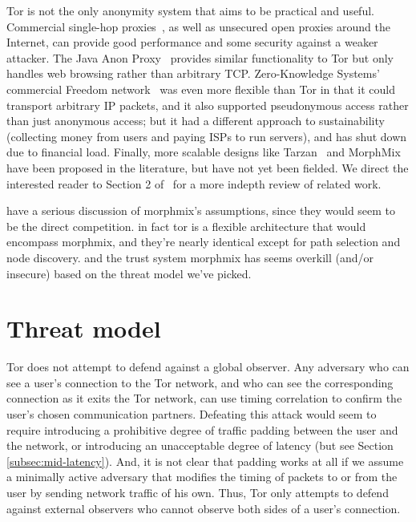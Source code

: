 \documentclass{llncs}
\begin{document}

Tor is not the only anonymity system that aims to be practical and useful.
Commercial single-hop proxies~\cite{anonymizer}, as well as unsecured
open proxies around the Internet, can provide good
performance and some security against a weaker attacker. The Java
Anon Proxy~\cite{web-mix} provides similar functionality to Tor but only
handles web browsing rather than arbitrary TCP\@.
Zero-Knowledge Systems' commercial Freedom
network~\cite{freedom21-security} was even more flexible than Tor in
that it could transport arbitrary IP packets, and it also supported
pseudonymous access rather than just anonymous access; but it had
a different approach to sustainability (collecting money from users
and paying ISPs to run servers), and has shut down due to financial
load.  Finally, more scalable designs like Tarzan~\cite{tarzan:ccs02} and
MorphMix~\cite{morphmix:fc04} have been proposed in the literature, but
have not yet been fielded. We direct the interested reader to Section
2 of~\cite{tor-design} for a more indepth review of related work.


have a serious discussion of morphmix's assumptions, since they would
seem to be the direct competition. in fact tor is a flexible architecture
that would encompass morphmix, and they're nearly identical except for
path selection and node discovery. and the trust system morphmix has
seems overkill (and/or insecure) based on the threat model we've picked.

\section{Threat model}
\label{sec:threat-model}

Tor does not attempt to defend against a global observer.  Any adversary who
can see a user's connection to the Tor network, and who can see the
corresponding connection as it exits the Tor network, can use timing
correlation to confirm the user's chosen
communication partners.  Defeating this attack would seem to require
introducing a prohibitive degree of traffic padding between the user and the
network, or introducing an unacceptable degree of latency (but see
Section \ref{subsec:mid-latency}).
And, it is not clear that padding works at all if we assume a
minimally active adversary that modifies the timing of packets
to or from the user by sending network traffic of his own. Thus, Tor
only attempts to defend against
external observers who cannot observe both sides of a user's
connection.
\end{document}
